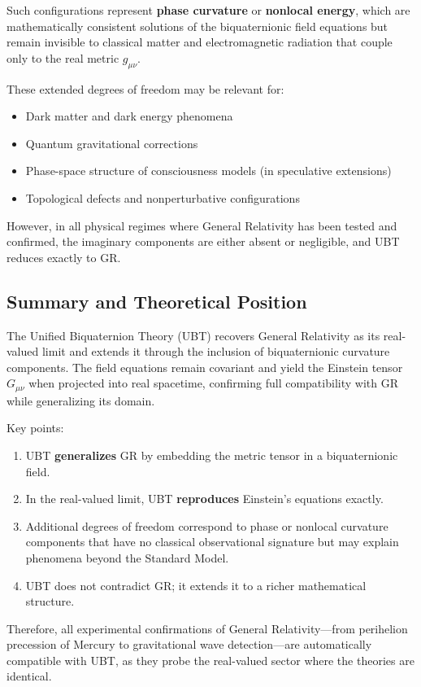 Such configurations represent \textbf{phase curvature} or \textbf{nonlocal energy}, which are mathematically consistent solutions of the biquaternionic field equations but remain invisible to classical matter and electromagnetic radiation that couple only to the real metric $g_{\mu\nu}$.

These extended degrees of freedom may be relevant for:
\begin{itemize}
  \item Dark matter and dark energy phenomena
  \item Quantum gravitational corrections
  \item Phase-space structure of consciousness models (in speculative extensions)
  \item Topological defects and nonperturbative configurations
\end{itemize}

However, in all physical regimes where General Relativity has been tested and confirmed, the imaginary components are either absent or negligible, and UBT reduces exactly to GR.

\subsection{Summary and Theoretical Position}

The Unified Biquaternion Theory (UBT) recovers General Relativity as its real-valued limit and extends it through the inclusion of biquaternionic curvature components. The field equations remain covariant and yield the Einstein tensor $G_{\mu\nu}$ when projected into real spacetime, confirming full compatibility with GR while generalizing its domain.

Key points:
\begin{enumerate}
  \item UBT \textbf{generalizes} GR by embedding the metric tensor in a biquaternionic field.
  \item In the real-valued limit, UBT \textbf{reproduces} Einstein's equations exactly.
  \item Additional degrees of freedom correspond to phase or nonlocal curvature components that have no classical observational signature but may explain phenomena beyond the Standard Model.
  \item UBT does not contradict GR; it extends it to a richer mathematical structure.
\end{enumerate}

Therefore, all experimental confirmations of General Relativity—from perihelion precession of Mercury to gravitational wave detection—are automatically compatible with UBT, as they probe the real-valued sector where the theories are identical.

